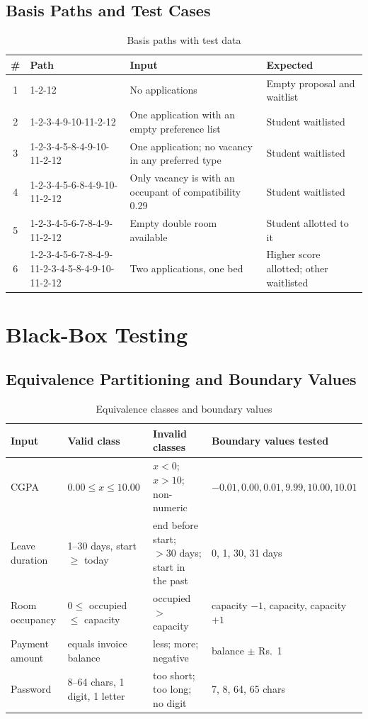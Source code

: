 \documentclass[11pt,a4paper]{report}
\begin{document}
\subsection{Basis Paths and Test Cases}
\begin{table}[H]
\centering\small
\caption{Basis paths with test data}\label{tab:basis}
\begin{tabularx}{\textwidth}{clLL}
\toprule
\textbf{\#} & \textbf{Path} & \textbf{Input} & \textbf{Expected}\\
 & 1-2-12 & No applications & Empty proposal and waitlist\\
2 & 1-2-3-4-9-10-11-2-12 & One application with an empty preference list & Student waitlisted\\
3 & 1-2-3-4-5-8-4-9-10-11-2-12 & One application; no vacancy in any preferred type & Student waitlisted\\
4 & 1-2-3-4-5-6-8-4-9-10-11-2-12 & Only vacancy is with an occupant of compatibility 0.29 & Student waitlisted\\
5 & 1-2-3-4-5-6-7-8-4-9-11-2-12 & Empty double room available & Student allotted to it\\
6 & 1-2-3-4-5-6-7-8-4-9-11-2-3-4-5-8-4-9-10-11-2-12 & Two applications, one bed & Higher score allotted; other waitlisted\\
\bottomrule
\end{tabularx}
\end{table}

\section{Black-Box Testing}
\subsection{Equivalence Partitioning and Boundary Values}
\begin{table}[H]
\centering\small
\caption{Equivalence classes and boundary values}\label{tab:ecp}
\begin{tabularx}{\textwidth}{lLLL}
\toprule
\textbf{Input} & \textbf{Valid class} & \textbf{Invalid classes} & \textbf{Boundary values tested}\\
\midrule
CGPA & $0.00 \le x \le 10.00$ & $x < 0$; $x > 10$; non-numeric & $-0.01, 0.00, 0.01, 9.99, 10.00, 10.01$\\
Leave duration & 1--30 days, start $\ge$ today & end before start; $> 30$ days; start in the past & 0, 1, 30, 31 days\\
Room occupancy & $0 \le$ occupied $\le$ capacity & occupied $>$ capacity & capacity $-1$, capacity, capacity $+1$\\
Payment amount & equals invoice balance & less; more; negative & balance $\pm$ Rs.~1\\
Password & 8--64 chars, 1 digit, 1 letter & too short; too long; no digit & 7, 8, 64, 65 chars\\
\bottomrule
\end{tabularx}
\end{table}
\end{document}
